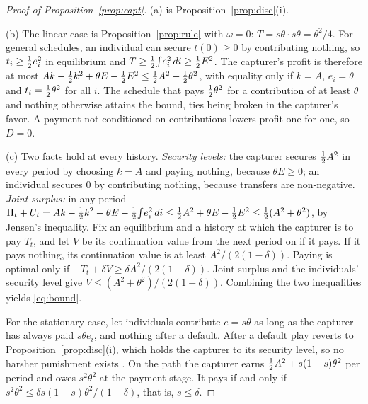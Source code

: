 \begin{proof}[Proof of Proposition~\ref{prop:capt}]
(a) is Proposition~\ref{prop:disc}(i).

(b) The linear case is Proposition~\ref{prop:rule} with $\omega=0$: $T=s\theta\cdot
s\theta=\theta^2/4$. For general schedules, an individual can secure $t(0)\ge 0$ by
contributing nothing, so $t_i\ge\tfrac{1}{2} e_i^2$ in equilibrium and
$T\ge\tfrac{1}{2}\!\int\! e_i^2\,di\ge\tfrac{1}{2} E^2$. The capturer's profit is therefore at most
$Ak-\tfrac{1}{2} k^2+\theta E-\tfrac{1}{2} E^2\le\tfrac{1}{2} A^2+\tfrac{1}{2}\theta^2$, with equality only if $k=A$,
$e_i=\theta$ and $t_i=\tfrac{1}{2}\theta^2$ for all $i$. The schedule that pays $\tfrac{1}{2}\theta^2$
for a contribution of at least $\theta$ and nothing otherwise attains the bound, ties being
broken in the capturer's favor. A payment
not conditioned on contributions lowers profit one for one, so $D=0$.

(c) Two facts hold at every history. \emph{Security levels:} the capturer secures
$\tfrac{1}{2} A^2$ in every period by choosing $k=A$ and paying nothing, because $\theta E\ge 0$;
an individual secures $0$ by contributing nothing, because transfers are non-negative.
\emph{Joint surplus:} in any period $\Pi_t+U_t=Ak-\tfrac{1}{2} k^2+\theta E-\tfrac{1}{2}\!\int\!
e_i^2\,di\le\tfrac{1}{2} A^2+\theta E-\tfrac{1}{2} E^2\le\tfrac{1}{2}(A^2+\theta^2)$, by Jensen's inequality.
Fix an equilibrium and a history at which the capturer is to pay $T_t$, and let $V$ be its
continuation value from the next period on if it pays. If it pays nothing, its
continuation value is at least $A^2/(2(1-\delta))$. Paying is optimal only if
$-T_t+\delta V\ge\delta A^2/(2(1-\delta))$. Joint surplus and the individuals' security
level give $V\le(A^2+\theta^2)/(2(1-\delta))$. Combining the two inequalities yields
\eqref{eq:bound}.

For the stationary case, let individuals contribute $e=s\theta$ as long as the capturer
has always paid $s\theta e_i$, and nothing after a default. After a default play reverts
to Proposition~\ref{prop:disc}(i), which holds the capturer to its security level, so no
harsher punishment exists \citep{Abreu1988}. On the path the capturer earns
$\tfrac{1}{2} A^2+s(1-s)\theta^2$ per period and owes $s^2\theta^2$ at the payment stage. It pays
if and only if $s^2\theta^2\le\delta s(1-s)\theta^2/(1-\delta)$, that is, $s\le\delta$.
\end{proof}

